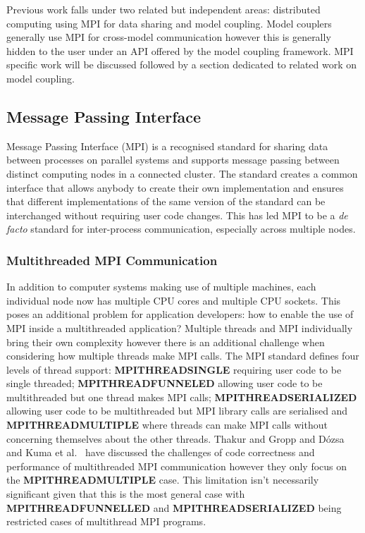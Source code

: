 \documentclass{acm_proc_article-sp}
\renewcommand{\_}{\underscore\hspace{0pt}}
\begin{document}
Previous work falls under two related but independent areas: distributed
computing using MPI for data sharing and model coupling. Model couplers
generally use MPI for cross-model communication however this is generally hidden
to the user under an API offered by the model coupling framework. MPI specific
work will be discussed followed by a section dedicated to related work on model
coupling.

\subsection*{Message Passing Interface}

Message Passing Interface (MPI) is a recognised standard for sharing data
between processes on parallel systems and supports message passing between
distinct computing nodes in a connected cluster. The standard creates a common
interface that allows anybody to create their own implementation and ensures
that different implementations of the same version of the standard can be
interchanged without requiring user code changes. This has led MPI to be a
\textit{de facto} standard for inter-process communication, especially across
multiple nodes.

\subsubsection*{Multithreaded MPI Communication}

In addition to computer systems making use of multiple machines, each individual
node now has multiple CPU cores and multiple CPU sockets. This poses an
additional problem for application developers: how to enable the use of MPI
inside a multithreaded application? Multiple threads and MPI individually bring
their own complexity however there is an additional challenge when considering
how multiple threads make MPI calls. The MPI standard defines four levels of
thread support: \textbf{MPI\_THREAD\_SINGLE} requiring user code to be single
threaded; \textbf{MPI\_THREAD\_FUNNELED} allowing user code to be multithreaded but
one thread makes MPI calls; \textbf{MPI\_THREAD\_SERIALIZED} allowing user code to be
multithreaded but MPI library calls are serialised and \textbf{MPI\_THREAD\_MULTIPLE}
where threads can make MPI calls without concerning themselves about the other
threads. Thakur and Gropp \cite{Thakur2009} and D\'{o}zsa and Kuma et al.\
\cite{Kumar} have discussed the challenges of code correctness and performance
of multithreaded MPI communication however they only focus on the
\textbf{MPI\_THREAD\_MULTIPLE} case. This limitation isn't necessarily significant
given that this is the most general case with \textbf{MPI\_THREAD\_FUNNELLED} and
\textbf{MPI\_THREAD\_SERIALIZED} being restricted cases of multithread MPI programs.
\end{document}
